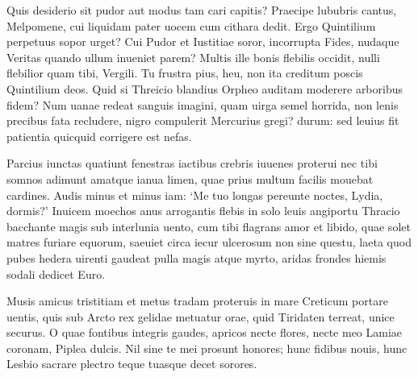 \documentclass{book}
\newenvironment {carmen} [1] [\relax] 
  {\Titulus \Versus \incipit*\numerus{1}#1}
  {\endVersus}
\newcommand {\Sapphic}   {\Forma \strophae {0 \poena 00 \poena 1}}
\newcommand {\Alcaic}    {\Forma \strophae {0 \poena 01 \poena 2}}
\newcommand {\AsclA}     {\Forma \strophae {0 \poena 00 \poena 2}}
\begin{document}
\begin{carmen}[\AsclA]


 Quis desiderio sit pudor aut modus
 tam cari capitis? Praecipe lububris
 cantus, Melpomene, cui liquidam pater
      uocem cum cithara dedit.
 Ergo Quintilium perpetuus sopor               
 urget? Cui Pudor et Iustitiae soror,
 incorrupta Fides, nudaque Veritas
      quando ullum inueniet parem?
 Multis ille bonis flebilis occidit,
 nulli flebilior quam tibi, Vergili.               
 Tu frustra pius, heu, non ita creditum
      poscis Quintilium deos.
 Quid si Threicio blandius Orpheo
 auditam moderere arboribus fidem?
 Num uanae redeat sanguis imagini,               
      quam uirga semel horrida,
 non lenis precibus fata recludere,
 nigro compulerit Mercurius gregi?
 durum: sed leuius fit patientia
       quicquid corrigere est nefas.                

\end{carmen}

\begin{carmen}[\Sapphic]


 Parcius iunctas quatiunt fenestras
 iactibus crebris iuuenes proterui
 nec tibi somnos adimunt amatque
      ianua limen,
 quae prius multum facilis mouebat               
 cardines. Audis minus et minus iam:
 `Me tuo longas pereunte noctes,
      Lydia, dormis?'
 Inuicem moechos anus arrogantis
 flebis in solo leuis angiportu               
 Thracio bacchante magis sub
      interlunia uento,
 cum tibi flagrans amor et libido,
 quae solet matres furiare equorum,
 saeuiet circa iecur ulcerosum               
      non sine questu,
 laeta quod pubes hedera uirenti
 gaudeat pulla magis atque myrto,
 aridas frondes hiemis sodali
       dedicet Euro.                

\end{carmen}

\begin{carmen}[\Alcaic]


 Musis amicus tristitiam et metus
 tradam proteruis in mare Creticum
      portare uentis, quis sub Arcto
      rex gelidae metuatur orae,
 quid Tiridaten terreat, unice               
 securus. O quae fontibus integris
      gaudes, apricos necte flores,
      necte meo Lamiae coronam,
 Piplea dulcis. Nil sine te mei
 prosunt honores; hunc fidibus nouis,               
      hunc Lesbio sacrare plectro
      teque tuasque decet sorores. 

\end{carmen}
\end{document}
